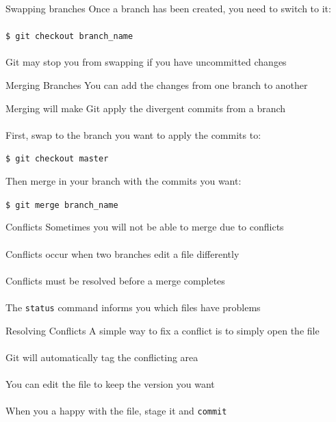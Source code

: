 \documentclass{beamer}
\begin{document}
\begin{frame}{Swapping branches}
    Once a branch has been created, you need to switch to it: \\~\\

    {\tt \$ git checkout branch\_name} \\~\\

    Git may stop you from swapping if you have uncommitted changes
\end{frame}

\begin{frame}{Merging Branches}
    You can add the changes from one branch to another

    Merging will make Git apply the divergent commits from a branch \\~\\

    First, swap to the branch you want to apply the commits to:

    {\tt \$ git checkout master}

    Then merge in your branch with the commits you want:

    {\tt \$ git merge branch\_name}
\end{frame}

\begin{frame}{Conflicts}
    Sometimes you will not be able to merge due to conflicts \\~\\

    Conflicts occur when two branches edit a file differently \\~\\

    Conflicts must be resolved before a merge completes \\~\\

    The {\tt status} command informs you which files have problems
\end{frame}

\begin{frame}{Resolving Conflicts}
    A simple way to fix a conflict is to simply open the file \\~\\

    Git will automatically tag the conflicting area \\~\\

    You can edit the file to keep the version you want \\~\\

    When you a happy with the file, stage it and {\tt commit}
\end{frame}
\end{document}
